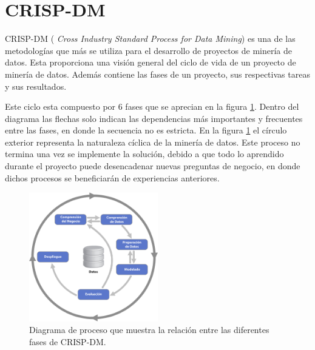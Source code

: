 \section{CRISP-DM}

CRISP-DM \cite{Wirth00crisp-dm:towards} (\textit{ Cross Industry Standard Process for Data Mining}) es una de las metodologías que más se utiliza para el desarrollo de proyectos de minería de datos. Esta proporciona una visión general del ciclo de vida de un proyecto de minería de datos. Además contiene las fases de un proyecto, sus respectivas tareas y sus resultados.

Este ciclo esta compuesto por 6 fases que se aprecian en la figura \ref{fig:CRISP-DM_diagrama}. Dentro del diagrama las flechas solo indican las dependencias más importantes y frecuentes entre las fases, en donde la secuencia no es estricta. En la figura \ref{fig:CRISP-DM_diagrama} el círculo exterior representa la naturaleza cíclica de la minería de datos. Este proceso no termina una vez se implemente la solución, debido a que todo lo aprendido durante el proyecto puede desencadenar nuevas preguntas de negocio, en donde dichos procesos se beneficiarán de experiencias anteriores.

\begin{figure}[H]
    \centering
    \includegraphics[width=0.5\textwidth]{images/CRISP-DM_Process_Diagram.jpg}
    \caption{Diagrama de proceso que muestra la relación entre las diferentes fases de CRISP-DM.}
    \label{fig:CRISP-DM_diagrama}
\end{figure}

